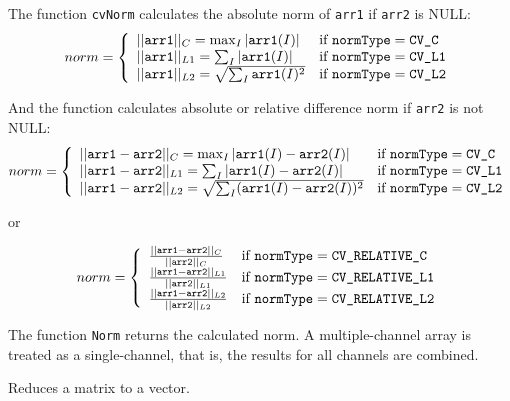 \begin{description}
\end{description}

The function \texttt{cvNorm} calculates the absolute norm of \texttt{arr1} if \texttt{arr2} is NULL:
\[
norm = \left\{ \begin{array}{l l} ||\texttt{arr1}||_C    = \max_I |\texttt{arr1}(I)| & \mbox{if $\texttt{normType} = \texttt{CV\_C}$}\\ ||\texttt{arr1}||_{L1} = \sum_I |\texttt{arr1}(I)| & \mbox{if $\texttt{normType} = \texttt{CV\_L1}$}\\ ||\texttt{arr1}||_{L2} = \sqrt{\sum_I \texttt{arr1}(I)^2} & \mbox{if $\texttt{normType} = \texttt{CV\_L2}$}\\ \end{array} \right.
\]

And the function calculates absolute or relative difference norm if \texttt{arr2} is not NULL:
\[
norm = \left\{ \begin{array}{l l} ||\texttt{arr1}-\texttt{arr2}||_C    = \max_I |\texttt{arr1}(I) - \texttt{arr2}(I)| & \mbox{if $\texttt{normType} = \texttt{CV\_C}$}\\ ||\texttt{arr1}-\texttt{arr2}||_{L1} = \sum_I |\texttt{arr1}(I) - \texttt{arr2}(I)| & \mbox{if $\texttt{normType} = \texttt{CV\_L1}$}\\ ||\texttt{arr1}-\texttt{arr2}||_{L2} = \sqrt{\sum_I (\texttt{arr1}(I) - \texttt{arr2}(I))^2} & \mbox{if $\texttt{normType} = \texttt{CV\_L2}$}\\ \end{array} \right.
\]

or

\[
norm = \left\{ \begin{array}{l l} \frac{||\texttt{arr1}-\texttt{arr2}||_C    }{||\texttt{arr2}||_C   } & \mbox{if $\texttt{normType} = \texttt{CV\_RELATIVE\_C}$}\\ \frac{||\texttt{arr1}-\texttt{arr2}||_{L1} }{||\texttt{arr2}||_{L1}} & \mbox{if $\texttt{normType} = \texttt{CV\_RELATIVE\_L1}$}\\ \frac{||\texttt{arr1}-\texttt{arr2}||_{L2} }{||\texttt{arr2}||_{L2}} & \mbox{if $\texttt{normType} = \texttt{CV\_RELATIVE\_L2}$}\\ \end{array} \right.
\]

The function \texttt{Norm} returns the calculated norm. A multiple-channel array is treated as a single-channel, that is, the results for all channels are combined.


Reduces a matrix to a vector.


